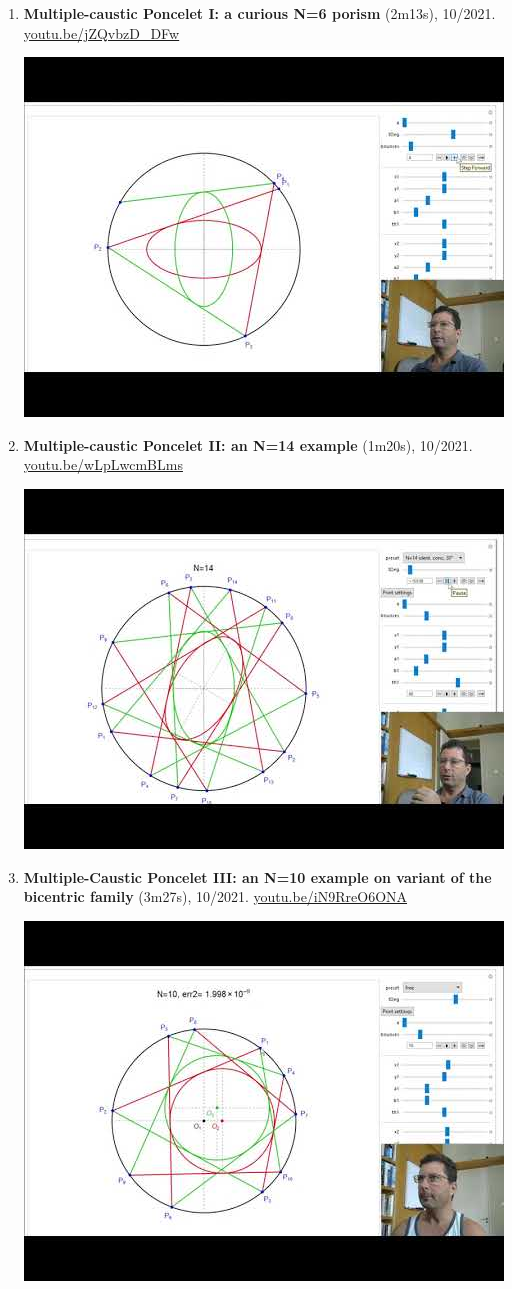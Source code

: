 \documentclass[12pt]{article}
\begin{document}
\begin{enumerate}[resume]
\item \textbf{Multiple-caustic Poncelet I: a curious N=6 porism} (2m13s), 10/2021. \href{https://youtu.be/jZQvbzD_DFw}{\url{youtu.be/jZQvbzD\_DFw}}
\begin{center}\includegraphics[width=.5\textwidth]{pics/jZQvbzD_DFw.jpg}\end{center}
% 
\item \textbf{Multiple-caustic Poncelet II: an N=14 example} (1m20s), 10/2021. \href{https://youtu.be/wLpLwcmBLms}{\url{youtu.be/wLpLwcmBLms}}
\begin{center}\includegraphics[width=.5\textwidth]{pics/wLpLwcmBLms.jpg}\end{center}
% 
\item \textbf{Multiple-Caustic Poncelet III: an N=10 example on variant of the bicentric family} (3m27s), 10/2021. \href{https://youtu.be/iN9RreO6ONA}{\url{youtu.be/iN9RreO6ONA}}
\begin{center}\includegraphics[width=.5\textwidth]{pics/iN9RreO6ONA.jpg}\end{center}

\end{enumerate}
\end{document}
